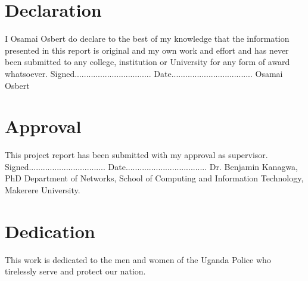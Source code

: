 \newpage
{}
\newpage
\section*{Declaration}
\noindent I Osamai Osbert do declare to the best of my knowledge that the information presented in this report is original and my own work and effort and has never been submitted to any college, institution or University for any form of award whatsoever.
\newline
\newline
\newline
\newline
\noindent Signed.................................      Date...................................
\newline
\noindent Osamai Osbert
\pagestyle{plain}
\noindent
\newpage
\section*{Approval}
\noindent This project report has been submitted with my approval as supervisor.
\newline
\newline
\newline
\newline
\noindent Signed.................................      Date...................................
\newline
\noindent Dr. Benjamin Kanagwa, PhD
\newline
\noindent Department of Networks,
\newline
\noindent School of Computing and Information Technology,
\newline
\noindent Makerere University.
\pagestyle{plain}
\noindent
\newpage
\section*{Dedication}
\noindent This work is dedicated to the men and women of the Uganda Police who tirelessly serve and protect our nation.
\newline
\newline
\pagestyle{plain}
\noindent
\newpage
\noindent
\newpage

